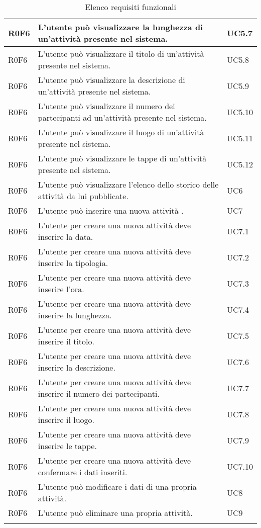 \begin{center}
\begin{longtable}{|p{3cm}|p{8cm}|p{3cm}|}
R0F6 & L’utente può visualizzare la lunghezza di un'attività presente nel sistema. & UC5.7 \\ \hline
R0F6 & L’utente può visualizzare il titolo di un'attività presente nel sistema. & UC5.8 \\ \hline
R0F6 & L’utente può visualizzare la descrizione di un'attività presente nel sistema. & UC5.9 \\ \hline
R0F6 & L’utente può visualizzare il numero dei partecipanti ad un'attività presente nel sistema. & UC5.10 \\ \hline
R0F6 & L’utente può visualizzare il luogo di un'attività presente nel sistema. & UC5.11 \\ \hline
R0F6 & L’utente può visualizzare le tappe di un'attività presente nel sistema. & UC5.12 \\ \hline

R0F6 & L’utente può visualizzare l'elenco dello storico delle attività da lui pubblicate. & UC6 \\ \hline

R0F6 & L’utente può inserire una nuova attività . & UC7 \\ \hline
R0F6 & L’utente per creare una nuova attività deve inserire la data. & UC7.1 \\ \hline
R0F6 & L’utente per creare una nuova attività deve inserire la tipologia. & UC7.2 \\ \hline
R0F6 & L’utente per creare una nuova attività deve inserire l'ora. & UC7.3 \\ \hline
R0F6 & L’utente per creare una nuova attività deve inserire la lunghezza. & UC7.4 \\ \hline
R0F6 & L’utente per creare una nuova attività deve inserire il titolo. & UC7.5 \\ \hline
R0F6 & L’utente per creare una nuova attività deve inserire la descrizione. & UC7.6 \\ \hline
R0F6 & L’utente per creare una nuova attività deve inserire il numero dei partecipanti. & UC7.7 \\ \hline
R0F6 & L’utente per creare una nuova attività deve inserire il luogo. & UC7.8 \\ \hline
R0F6 & L’utente per creare una nuova attività deve inserire le tappe. & UC7.9 \\ \hline
R0F6 & L’utente per creare una nuova attività deve confermare i dati inseriti. & UC7.10 \\ \hline

R0F6 & L’utente può modificare i dati di una propria attività. & UC8 \\ \hline
R0F6 & L’utente può eliminare una propria attività. & UC9 \\ \hline
\caption{Elenco requisiti funzionali}
\end{longtable}
\end{center}
\newpage
